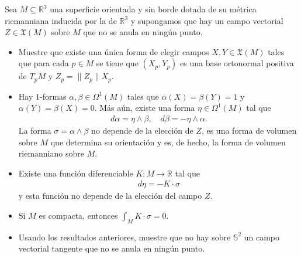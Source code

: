 \documentclass[11pt]{article}
\newcommand{\R}{\mathbb{R}}
\newcommand{\Ss}{\mathbb{S}}
\newcommand{\X}{\mathfrak{X}}
\newcommand{\paint}[1]{\color{color}{#1}}
\newenvironment{exercise}[2][Ejercicio]{\begin{trivlist}
\item[\hskip \labelsep \paint{{\bfseries #1}}\hskip \labelsep {\bfseries #2.}]}{\end{trivlist}}
\begin{document}
\begin{exercise}{7} Sea $M \subseteq \R^3$ una superficie orientada y sin borde dotada de su métrica riemanniana inducida por la de $\R^3$ y supongamos que hay un campo vectorial $Z \in \X(M)$ sobre $M$ que no se anula en ningún punto.
\begin{itemize}[listparindent = \parindent]
\item[(a)] Muestre que existe una única forma de elegir campos $X,Y \in \X(M)$ tales que para cada $p \in M$ se tiene que $(X_p,Y_p)$ es una base ortonormal positiva de $T_pM$ y $Z_p = \|Z_p\|X_p$. 
\item[(b)] Hay $1$-formas $\alpha,\beta\in \Omega^1(M)$ tales que $\alpha(X) = \beta(Y) = 1$ y $\alpha(Y) = \beta(X) = 0$. Más aún, existe una forma $\eta \in \Omega^1(M)$ tal que
\begin{align*}
d\alpha = \eta \wedge \beta, \quad d\beta = -\eta \wedge \alpha.
\end{align*}
La forma $\sigma  = \alpha \wedge \beta$ no depende de la elección de $Z$, es una forma de volumen sobre $M$ que determina su orientación y es, de hecho, la forma de volumen riemanniano sobre $M$.
\item[(c)] Existe una función diferenciable $K : M \to \R$ tal que
\begin{align*}
d\eta = -K \cdot \sigma
\end{align*}
y esta función no depende de la elección del campo $Z$.
\item[(d)] Si $M$ es compacta, entonces $\int_M K \cdot \sigma = 0$.
\item[(e)] Usando los resultados anteriores, muestre que no hay sobre $\Ss^2$ un campo vectorial tangente que no se anula en ningún punto.
\end{itemize}
\end{exercise}
\end{document}
